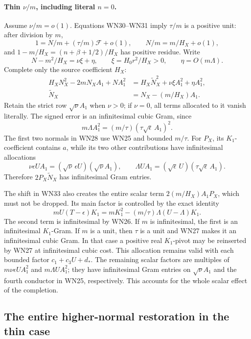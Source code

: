 \paragraph{Thin \(\nu/m\), including literal \(n=0\).}
Assume \(\nu/m=o(1)\). Equations WN30--WN31 imply
\(\tau/m\) is a positive unit: after division by \(m\),
\[
 1=N/m+(\tau/m)\mathcal F+o(1),\qquad
 N/m=m/H_X+o(1),
\]
and \(1-m/H_X=(n+\beta+1/2)/H_X\) has positive residue.
Write
\[
 N-m^2/H_X=\nu\xi+\eta,\qquad
 \xi=H_0r^2/H_X>0,\qquad \eta=O(m\Lambda).
\]
Complete only the source coefficient \(H_X\):
\[
\begin{split}
 H_XN_X^2-2mN_XA_1+NA_1^2
 &=H_X\widetilde N_X^2+\nu\xi A_1^2+\eta A_1^2,\\
 \widetilde N_X&=N_X-(m/H_X)A_1.
\end{split}\tag{WN33}
\]
Retain the strict row \(\sqrt\nu A_1\) when \(\nu>0\);
if \(\nu=0\), all terms allocated to it vanish literally.
The signed error is an infinitesimal cubic Gram, since
\[
 m\Lambda A_1^2=(m/\tau)(\tau\sqrt\epsilon\,A_1)^2.
 \tag{WN34}
\]
The first two normals in WN28 use WN25 and bounded \(m/\tau\).
For \(P_X\), its \(K_1\)-coefficient contains \(a\), while its
two other contributions have infinitesimal allocations
\[
 \nu\epsilon U A_1=(\sqrt\nu\,\epsilon U)(\sqrt\nu A_1),
 \qquad \Lambda U A_1=(\sqrt\epsilon\,U)
                         (\tau\sqrt\epsilon\,A_1).
 \tag{WN35}
\]
Therefore \(2P_X\widetilde N_X\) has infinitesimal Gram entries.

The shift in WN33 also creates the entire scalar term
\(2(m/H_X)A_1P_X\), which must not be dropped.
Its main factor is controlled by the exact identity
\[
 mU(T-\epsilon)K_1
   =mK_1^2-(m/\tau)\Lambda(U-\Lambda)K_1 .
 \tag{WN36}
\]
The second term is infinitesimal by WN26. If \(m\) is
infinitesimal, the first is an infinitesimal \(K_1\)-Gram.
If \(m\) is a unit, then \(\tau\) is a unit and WN27
makes it an infinitesimal cubic Gram. In that case a positive
real \(K_1\)-pivot may be reinserted by WN27 at infinitesimal
cubic cost. This allocation remains valid with each bounded
factor \(c_1+c_3U+d_*\).
The remaining scalar factors are multiples of
\(m\nu\epsilon U A_1^2\) and \(m\Lambda U A_1^2\);
they have infinitesimal Gram entries on \(\sqrt\nu A_1\)
and the fourth conductor in WN25, respectively.
This accounts for the whole scalar effect of the completion.

\subsection{The entire higher-normal restoration in the thin case}

